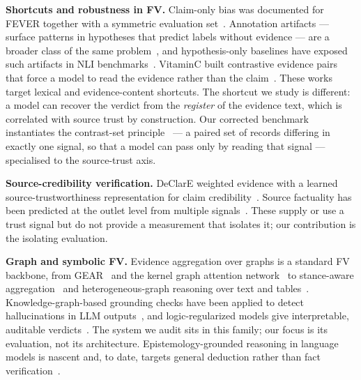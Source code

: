 \documentclass[conference]{IEEEtran}
\begin{document}
\textbf{Shortcuts and robustness in FV.} Claim-only bias was documented for FEVER together with a symmetric evaluation set~\cite{schuster2019debias}. Annotation artifacts — surface patterns in hypotheses that predict labels without evidence — are a broader class of the same problem~\cite{gururangan2018annotation}, and hypothesis-only baselines have exposed such artifacts in NLI benchmarks~\cite{poliak2018hypothesis}. VitaminC built contrastive evidence pairs that force a model to read the evidence rather than the claim~\cite{schuster2021vitaminc}. These works target lexical and evidence-content shortcuts. The shortcut we study is different: a model can recover the verdict from the \emph{register} of the evidence text, which is correlated with source trust by construction. Our corrected benchmark instantiates the contrast-set principle~\cite{gardner2020evaluating} — a paired set of records differing in exactly one signal, so that a model can pass only by reading that signal — specialised to the source-trust axis.

\textbf{Source-credibility verification.} DeClarE weighted evidence with a learned source-trustworthiness representation for claim credibility~\cite{popat2018declare}. Source factuality has been predicted at the outlet level from multiple signals~\cite{baly2018factuality}. These supply or use a trust signal but do not provide a measurement that isolates it; our contribution is the isolating evaluation.

\textbf{Graph and symbolic FV.} Evidence aggregation over graphs is a standard FV backbone, from GEAR~\cite{zhou2019gear} and the kernel graph attention network~\cite{liu2020kgat} to stance-aware aggregation~\cite{si2021tarsa} and heterogeneous-graph reasoning over text and tables~\cite{gong2024heterfc}. Knowledge-graph-based grounding checks have been applied to detect hallucinations in LLM outputs~\cite{sansford2024grapheval}, and logic-regularized models give interpretable, auditable verdicts~\cite{chen2022loren}. The system we audit sits in this family; our focus is its evaluation, not its architecture. Epistemology-grounded reasoning in language models is nascent and, to date, targets general deduction rather than fact verification~\cite{sathish2026pramana}.
\end{document}
